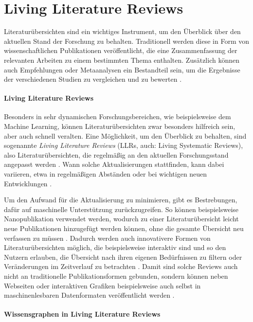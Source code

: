 \section{Living Literature Reviews}
\label{sec:living-literature-reviews}


Literaturübersichten sind ein wichtiges Instrument, um den Überblick über den aktuellen Stand der Forschung zu behalten.
Traditionell werden diese in Form von wissenschaftlichen Publikationen veröffentlicht, die eine Zusammenfassung der relevanten Arbeiten zu einem bestimmten Thema enthalten.
Zusätzlich können auch Empfehlungen oder Metaanalysen ein Bestandteil sein, um die Ergebnisse der verschiedenen Studien zu vergleichen und zu bewerten \cite{elliott2017living}.

\paragraph{Living Literature Reviews}

Besonders in sehr dynamischen Forschungsbereichen, wie beispielsweise dem Machine Learning, können  Literaturübersichten zwar besonders hilfreich sein, aber auch schnell veralten.
Eine Möglichkeit, um den Überblick zu behalten, sind sogenannte \textit{Living Literature Reviews} (LLRs, auch: Living Systematic Reviews), also Literaturübersichten, die regelmäßig an den aktuellen Forschungsstand angepasst werden \cite{living-lit-review}.
Wann solche Aktualisierungen stattfinden, kann dabei variieren, etwa in regelmäßigen Abständen oder bei wichtigen neuen Entwicklungen \cite{cochrane}.

Um den Aufwand für die Aktualisierung zu minimieren, gibt es Bestrebungen, dafür auf maschinelle Unterstützung zurückzugreifen.
So können beispielsweise Nanopublikation \cite{nanopubs} verwendet werden, wodurch zu einer Literaturübersicht leicht neue Publikationen hinzugefügt werden können, ohne die gesamte Übersicht neu verfassen zu müssen \cite{living-lit-review}.
Dadurch werden auch innovativere Formen von Literaturübersichten möglich, die beispielsweise interaktiv sind und so den Nutzern erlauben, die Übersicht nach ihren eigenen Bedürfnissen zu filtern oder Veränderungen im Zeitverlauf zu betrachten \cite{living-lit-review}.
Damit sind solche Reviews auch nicht an traditionelle Publikationsformen gebunden, sondern können neben Webseiten oder interaktiven Grafiken beispielsweise auch selbst in maschinenlesbaren Datenformaten veröffentlicht werden \cite{linked-lit-review}.


\paragraph{Wissensgraphen in Living Literature Reviews}

